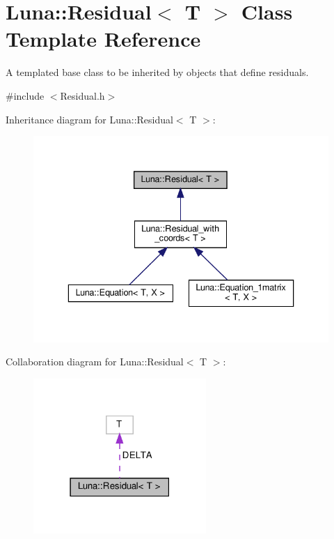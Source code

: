 \hypertarget{classLuna_1_1Residual}{}\section{Luna\+:\+:Residual$<$ T $>$ Class Template Reference}
\label{classLuna_1_1Residual}


A templated base class to be inherited by objects that define residuals.  




{\ttfamily \#include $<$Residual.\+h$>$}



Inheritance diagram for Luna\+:\+:Residual$<$ T $>$\+:\nopagebreak
\begin{figure}[H]
\begin{center}
\leavevmode
\includegraphics[width=336pt]{classLuna_1_1Residual__inherit__graph}
\end{center}
\end{figure}


Collaboration diagram for Luna\+:\+:Residual$<$ T $>$\+:\nopagebreak
\begin{figure}[H]
\begin{center}
\leavevmode
\includegraphics[width=186pt]{classLuna_1_1Residual__coll__graph}
\end{center}
\end{figure}
